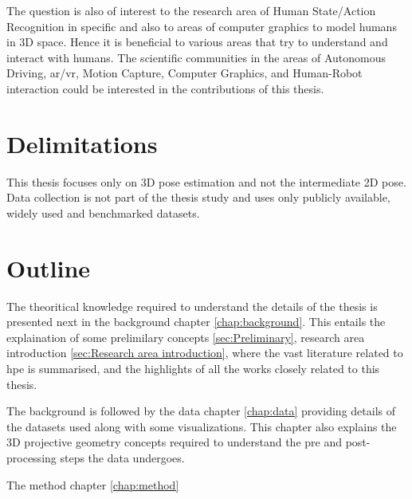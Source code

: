 The question is also of interest to the research area of Human State/Action Recognition in specific and also to areas of computer graphics to model humans in 3D space. Hence it is beneficial to various areas that try to understand and interact with humans. The scientific communities in the areas of Autonomous Driving, \ac{ar/vr}, Motion Capture, Computer Graphics, and Human-Robot interaction could be interested in the contributions of this thesis.

\section{Delimitations}
\label{sec:delimitations}
This thesis focuses only on 3D pose estimation and not the intermediate 2D pose. Data collection is not part of the thesis study and uses only publicly available, widely used and benchmarked datasets.

\section{Outline}
\label{sec:outline}
The theoritical knowledge required to understand the details of the thesis is presented next in the background chapter \ref{chap:background}. This entails the explaination of some prelimilary concepts \ref{sec:Preliminary}, research area introduction \ref{sec:Research area introduction}, where the vast literature related to \ac{hpe} is summarised, and the highlights of all the works closely related to this thesis.

The background is followed by the data chapter \ref{chap:data} providing details of the datasets used along with some visualizations. This chapter also explains the 3D projective geometry concepts required to understand the pre and post-processing steps the data undergoes.

The method chapter \ref{chap:method} 


